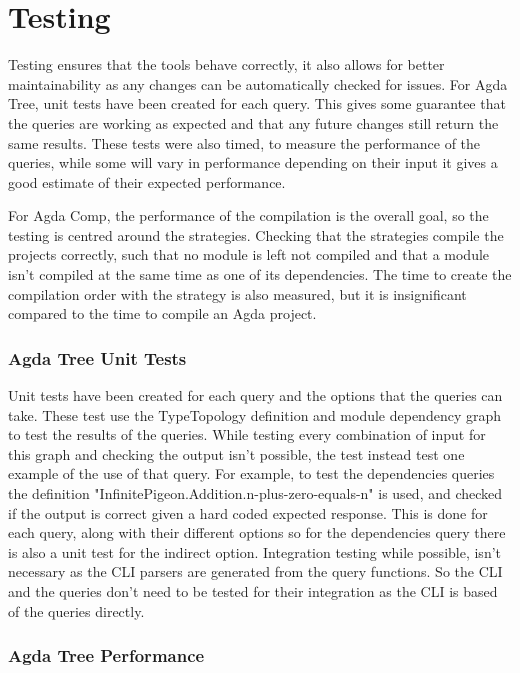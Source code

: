 
\chapter{Testing}

Testing ensures that the tools behave correctly, it also allows for better
maintainability as any changes can be automatically checked for issues. For
Agda Tree, unit tests have been created for each query. This gives some
guarantee that the queries are working as expected and that any future changes
still return the same results. These tests were also timed, to measure the
performance of the queries, while some will vary in performance depending on
their input it gives a good estimate of their expected performance.

For Agda Comp, the performance of the compilation is the overall goal, so the
testing is centred around the strategies. Checking that the strategies compile
the projects correctly, such that no module is left not compiled and that a
module isn't compiled at the same time as one of its dependencies. The time to
create the compilation order with the strategy is also measured, but it is
insignificant compared to the time to compile an Agda project.

\subsection{Agda Tree Unit Tests}

Unit tests have been created for each query and the options that the queries
can take. These test use the TypeTopology definition and module dependency
graph to test the results of the queries. While testing every combination of
input for this graph and checking the output isn't possible, the test instead
test one example of the use of that query. For example, to test the
dependencies queries the definition
"InfinitePigeon.Addition.n-plus-zero-equals-n" is used, and checked if the
output is correct given a hard coded expected response. This is done for each
query, along with their different options so for the dependencies query there
is also a unit test for the indirect option. Integration testing while
possible, isn't necessary as the CLI parsers are generated from the query
functions. So the CLI and the queries don't need to be tested for their
integration as the CLI is based of the queries directly. 

\subsection{Agda Tree Performance} \label{sub:agda tree performance}

